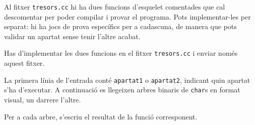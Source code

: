\medskip

Al fitxer \verb|tresors.cc| hi ha dues funcions d'esquelet comentades que cal descomentar per poder compilar i provar el programa. Pots implementar-les per separat: hi ha jocs de prova específics per a cadascuna, de manera que pots validar un apartat sense tenir l'altre acabat.

\medskip

Has d'implementar les dues funcions en el fitxer \verb|tresors.cc| i enviar només aquest fitxer.

\Input

La primera línia de l'entrada conté \verb|apartat1| o \verb|apartat2|, indicant quin apartat s'ha d'executar. A continuació es llegeixen arbres binaris de \verb|char|s en format visual, un darrere l'altre.

\Output

Per a cada arbre, s'escriu el resultat de la funció corresponent.

\SampleTwoCol
